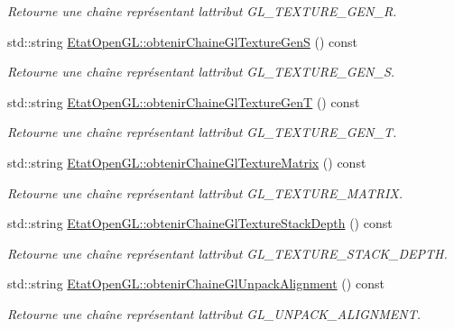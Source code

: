 \begin{DoxyCompactItemize}
\begin{DoxyCompactList}\small\item\em Retourne une chaîne représentant l\textquotesingle{}attribut G\+L\+\_\+\+T\+E\+X\+T\+U\+R\+E\+\_\+\+G\+E\+N\+\_\+\+R. \end{DoxyCompactList}\item 
std\+::string \hyperlink{group__utilitaire_gac92ef30b356fe2de552d88b455aa0b20}{Etat\+Open\+G\+L\+::obtenir\+Chaine\+Gl\+Texture\+Gen\+S} () const 
\begin{DoxyCompactList}\small\item\em Retourne une chaîne représentant l\textquotesingle{}attribut G\+L\+\_\+\+T\+E\+X\+T\+U\+R\+E\+\_\+\+G\+E\+N\+\_\+\+S. \end{DoxyCompactList}\item 
std\+::string \hyperlink{group__utilitaire_gaa225300590e106cd32d3a011d1ff6599}{Etat\+Open\+G\+L\+::obtenir\+Chaine\+Gl\+Texture\+Gen\+T} () const 
\begin{DoxyCompactList}\small\item\em Retourne une chaîne représentant l\textquotesingle{}attribut G\+L\+\_\+\+T\+E\+X\+T\+U\+R\+E\+\_\+\+G\+E\+N\+\_\+\+T. \end{DoxyCompactList}\item 
std\+::string \hyperlink{group__utilitaire_gad21a2e048b745fe84c5befbd361f2f5e}{Etat\+Open\+G\+L\+::obtenir\+Chaine\+Gl\+Texture\+Matrix} () const 
\begin{DoxyCompactList}\small\item\em Retourne une chaîne représentant l\textquotesingle{}attribut G\+L\+\_\+\+T\+E\+X\+T\+U\+R\+E\+\_\+\+M\+A\+T\+R\+I\+X. \end{DoxyCompactList}\item 
std\+::string \hyperlink{group__utilitaire_ga278f05112b89edd0cbb3d601d73fadb4}{Etat\+Open\+G\+L\+::obtenir\+Chaine\+Gl\+Texture\+Stack\+Depth} () const 
\begin{DoxyCompactList}\small\item\em Retourne une chaîne représentant l\textquotesingle{}attribut G\+L\+\_\+\+T\+E\+X\+T\+U\+R\+E\+\_\+\+S\+T\+A\+C\+K\+\_\+\+D\+E\+P\+T\+H. \end{DoxyCompactList}\item 
std\+::string \hyperlink{group__utilitaire_gabcc3fe54f0a5f429af71e1bacef5a9c9}{Etat\+Open\+G\+L\+::obtenir\+Chaine\+Gl\+Unpack\+Alignment} () const 
\begin{DoxyCompactList}\small\item\em Retourne une chaîne représentant l\textquotesingle{}attribut G\+L\+\_\+\+U\+N\+P\+A\+C\+K\+\_\+\+A\+L\+I\+G\+N\+M\+E\+N\+T. \end{DoxyCompactList}\item 

\end{DoxyCompactItemize}
